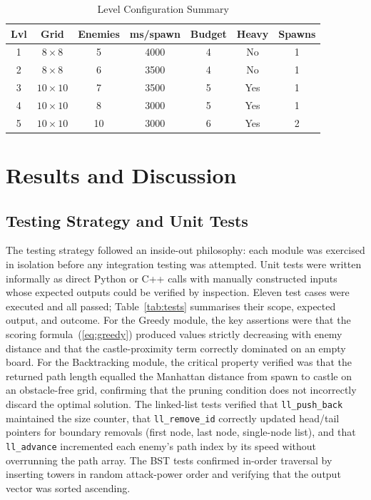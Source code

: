 \documentclass[conference]{IEEEtran}
\begin{document}
\begin{table}[t]
\centering
\caption{Level Configuration Summary}
\label{tab:levels}
\begin{tabular}{ccccccc}
\toprule
\textbf{Lvl} & \textbf{Grid} & \textbf{Enemies} & \textbf{ms/spawn}
  & \textbf{Budget} & \textbf{Heavy} & \textbf{Spawns} \\
\midrule
1 & $8\!\times\!8$   &  5 & 4000 & 4 & No  & 1 \\
2 & $8\!\times\!8$   &  6 & 3500 & 4 & No  & 1 \\
3 & $10\!\times\!10$ &  7 & 3500 & 5 & Yes & 1 \\
4 & $10\!\times\!10$ &  8 & 3000 & 5 & Yes & 1 \\
5 & $10\!\times\!10$ & 10 & 3000 & 6 & Yes & 2 \\
\bottomrule
\end{tabular}
\end{table}

\section{Results and Discussion}
\label{sec:results}

\subsection{Testing Strategy and Unit Tests}
\label{subsec:unit}

The testing strategy followed an inside-out philosophy: each module was
exercised in isolation before any integration testing was attempted.
Unit tests were written informally as direct Python or C++ calls with
manually constructed inputs whose expected outputs could be verified by
inspection.
Eleven test cases were executed and all passed; Table~\ref{tab:tests}
summarises their scope, expected output, and outcome.
For the Greedy module, the key assertions were that the scoring
formula~(\ref{eq:greedy}) produced values strictly decreasing with enemy
distance and that the castle-proximity term correctly dominated on an empty
board.
For the Backtracking module, the critical property verified was that the
returned path length equalled the Manhattan distance from spawn to castle
on an obstacle-free grid, confirming that the pruning condition does not
incorrectly discard the optimal solution.
The linked-list tests verified that \texttt{ll\_push\_back} maintained the
size counter, that \texttt{ll\_remove\_id} correctly updated head/tail
pointers for boundary removals (first node, last node, single-node list),
and that \texttt{ll\_advance} incremented each enemy's path index by its
speed without overrunning the path array.
The BST tests confirmed in-order traversal by inserting towers in random
attack-power order and verifying that the output vector was sorted ascending.
\end{document}
